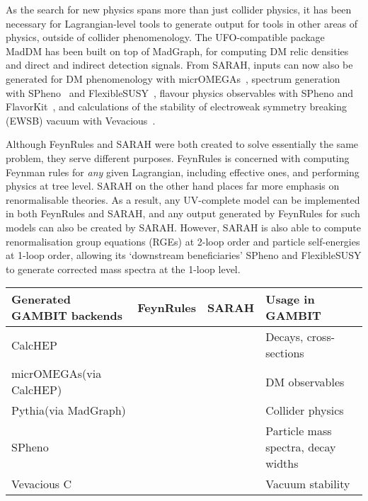 \documentclass[pdftex,twocolumn,epjc3_preprint,runningheads]{svjour3}
\renewcommand{\_}{\discretionary{\underscore}{}{\underscore}}
\newcommand{\gambit}{\textsf{GAMBIT}\xspace}
\newcommand{\GB}{\gambit}
\newcommand{\pythia}{\textsf{Pythia}\xspace}
\newcommand{\mo}{\micromegas}
\newcommand{\micromegas}{\textsf{micrOMEGAs}\xspace}
\newcommand\FS{\FlexibleSUSY}
\newcommand\FlexibleSUSY{\textsf{FlexibleSUSY}\xspace}
\newcommand{\gum}{\textsf{GUM}\xspace}
\newcommand{\fr}{\textsf{FeynRules}\xspace}
\newcommand{\sarah}{\textsf{SARAH}\xspace}
\newcommand{\CH}{\textsf{CalcHEP}\xspace}
\newcommand{\MG}{\textsf{MadGraph}\xspace}
\newcommand{\mdm}{\textsf{MadDM}\xspace}
\newcommand{\ufo}{\textsf{UFO}\xspace}
\newcommand{\veva}{\textsf{Vevacious}\xspace}
\newcommand{\spheno}{\textsf{SPheno}\xspace}
\newcommand\xx{\raisebox{0.2ex}{\smaller ++}\xspace}
\newcommand{\cmark}{\ding{51}}%
\newcommand{\xmark}{\ding{55}}%
\begin{document}
As the search for new physics spans more than just collider physics, it has been necessary for Lagrangian-level tools to generate output for tools in other areas of physics, outside of collider phenomenology.  The \ufo-compatible package \mdm \cite{Backovic:2013dpa,Backovic:2015cra,Ambrogi:2018jqj} has been built on top of \MG, for computing DM relic densities and direct and indirect detection signals. From \sarah, inputs can now also be generated for DM phenomenology with \mo~\cite{Belanger:2001fz,Belanger:2004yn,Belanger:2006is,Belanger:2008sj,Belanger:2010gh,Belanger:2013oya,micromegas}, spectrum generation with \spheno~\cite{Porod:2003um,Porod:2011nf} and \FS~\cite{Athron:2014yba,Athron:2017fvs,Athron:2021kve}, flavour physics observables with \spheno and \textsf{FlavorKit}~\cite{Porod:2014xia}, and calculations of the stability of electroweak symmetry breaking (EWSB) vacuum with \veva~\cite{Camargo-Molina:2013qva}.

Although \fr and \sarah were both created to solve essentially the same problem, they serve different purposes. \fr is concerned with computing Feynman rules for \textit{any} given Lagrangian, including effective ones, and performing physics at tree level. \sarah on the other hand places far more emphasis on renormalisable theories. As a result, any UV-complete model can be implemented in both \fr and \sarah, and any output generated by \fr for such models can also be created by \sarah.  However, \sarah is also able to compute renormalisation group equations (RGEs) at 2-loop order and particle self-energies at 1-loop order, allowing its `downstream beneficiaries' \spheno and \FS to generate corrected mass spectra at the 1-loop level.

\begin{table*}[t!]
  \centering
  \begin{tabular}{l l l l}
  \toprule
  Generated \GB backends                 &  \fr    & \sarah & Usage in \GB \\
  \midrule
  \CH                              & \cmark  & \cmark & Decays, cross-sections \\
  \mo (via \CH)                    & \cmark  & \cmark & DM observables \\
  \pythia (via \MG)                & \cmark  & \cmark & Collider physics \\
  \spheno                          & \xmark  & \cmark & Particle mass spectra, decay widths \\
  \veva C\xx                           & \xmark  & \cmark & Vacuum stability \\
  \bottomrule
  \end{tabular}
  \caption{\GB backends with \gum support and Lagrangian-level tools used to generate them.  Apart from the external packages listed, \gum also produces \GB Core and physics module code tailored to the model and observables of interest.
  }
  \label{tab::outputs}
\end{table*}
\end{document}
